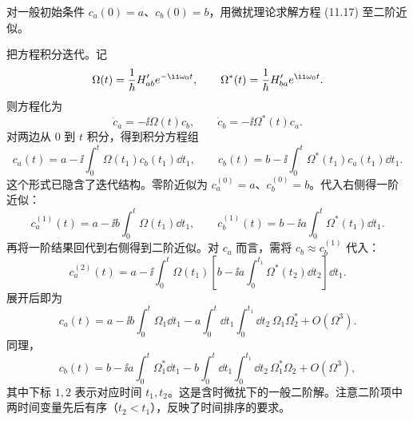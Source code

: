 \begin{question}
对一般初始条件 $c_a(0)=a$、$c_b(0)=b$，用微扰理论求解方程 (11.17) 至二阶近似。

\par\smallskip
{}

\end{question}
\begin{solution}
把方程积分迭代。记
\[
\Omega(t)={1\over\hbar}H'_{ab}e^{-\ii\omega_0t},
\qquad
\Omega^*(t)={1\over\hbar}H'_{ba}e^{\ii\omega_0t}.
\]
则方程化为
\[
\dot c_a=-\ii\Omega(t)c_b,\qquad
\dot c_b=-\ii\Omega^*(t)c_a.
\]
对两边从 $0$ 到 $t$ 积分，得到积分方程组
\[
c_a(t)=a-\ii\int_0^t\Omega(t_1)c_b(t_1)\dd t_1,
\qquad
c_b(t)=b-\ii\int_0^t\Omega^*(t_1)c_a(t_1)\dd t_1.
\]
这个形式已隐含了迭代结构。零阶近似为 $c_a^{(0)}=a$、$c_b^{(0)}=b$。代入右侧得一阶近似：
\[
c_a^{(1)}(t)=a-\ii b\int_0^t\Omega(t_1)\dd t_1,
\qquad
c_b^{(1)}(t)=b-\ii a\int_0^t\Omega^*(t_1)\dd t_1.
\]
再将一阶结果回代到右侧得到二阶近似。对 $c_a$ 而言，需将 $c_b\approx c_b^{(1)}$ 代入：
\[
c_a^{(2)}(t)=a-\ii\int_0^t\Omega(t_1)\left[b-\ii a\int_0^{t_1}\Omega^*(t_2)\dd t_2\right]\dd t_1.
\]
展开后即为
\[
c_a(t)=a-\ii b\int_0^t\Omega_1\dd t_1
-a\int_0^t\dd t_1\int_0^{t_1}\dd t_2\,\Omega_1\Omega_2^*+O(\Omega^3).
\]
同理，
\[
c_b(t)=b-\ii a\int_0^t\Omega_1^*\dd t_1
-b\int_0^t\dd t_1\int_0^{t_1}\dd t_2\,\Omega_1^*\Omega_2+O(\Omega^3),
\]
其中下标 $1,2$ 表示对应时间 $t_1,t_2$。这是含时微扰下的一般二阶解。注意二阶项中两时间变量先后有序（$t_2<t_1$），反映了时间排序的要求。
\end{solution}

